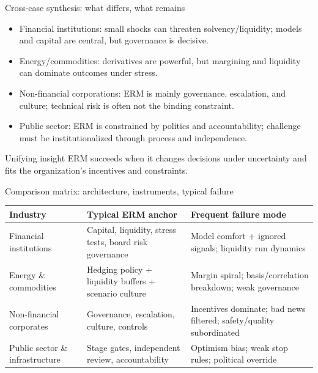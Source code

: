 \documentclass[aspectratio=169, 10pt]{beamer} %
\begin{document}
\begin{frame}{Cross-case synthesis: what differs, what remains}
\begin{itemize}
  \item[$\bullet$] Financial institutions: small shocks can threaten solvency/liquidity; models and capital are central, but governance is decisive.
  \item[$\bullet$] Energy/commodities: derivatives are powerful, but margining and liquidity can dominate outcomes under stress.
  \item[$\bullet$] Non-financial corporations: ERM is mainly governance, escalation, and culture; technical risk is often not the binding constraint.
  \item[$\bullet$] Public sector: ERM is constrained by politics and accountability; challenge must be institutionalized through process and independence.
\end{itemize}
\begin{block}{Unifying insight}
ERM succeeds when it changes decisions under uncertainty and fits the organization’s incentives and constraints.
\end{block}
\end{frame}

\begin{frame}{Comparison matrix: architecture, instruments, typical failure}
\small
\begin{tabular}{p{2.6cm}p{3.4cm}p{3.6cm}}
\hline
\textbf{Industry} & \textbf{Typical ERM anchor} & \textbf{Frequent failure mode} \\
\hline
Financial institutions & Capital, liquidity, stress tests, board risk governance & Model comfort + ignored signals; liquidity run dynamics \\
Energy \& commodities & Hedging policy + liquidity buffers + scenario culture & Margin spiral; basis/correlation breakdown; weak governance \\
Non-financial corporates & Governance, escalation, culture, controls & Incentives dominate; bad news filtered; safety/quality subordinated \\
Public sector \& infrastructure & Stage gates, independent review, accountability & Optimism bias; weak stop rules; political override \\
\hline
\end{tabular}

\medskip 

 \href{https://github.com/fsananou/bsb-erm/blob/main/_exercice_and_cases.pdf}{}

\end{frame}
\end{document}

